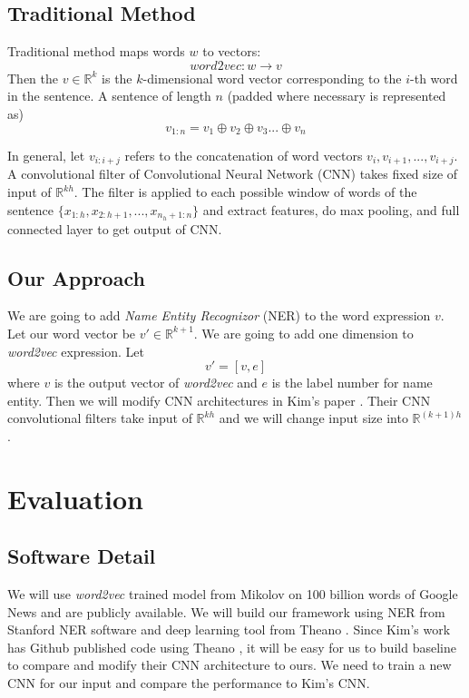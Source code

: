 \documentclass[10pt,twocolumn,letterpaper]{article}
\begin{document}
\subsection{Traditional Method}
Traditional method maps words $w$ to vectors:
$$word2vec:w \rightarrow v $$
Then the $v \in \mathbb{R}^k$ is the $k$-dimensional word vector corresponding to the $i$-th word in the sentence. A sentence of length $n$ (padded where necessary is represented as)
$$v_{1:n} = v_1 \oplus v_2 \oplus v_3 ... \oplus v_n$$

In general, let $v_{i:i+j}$ refers to the concatenation of word vectors $v_i, v_{i+1}, ..., v_{i+j}$. A convolutional filter of Convolutional Neural Network (CNN)  \cite{kim2014convolutional} takes fixed size of input of $\mathbb{R}^{kh}$. The filter is applied to each possible window of words of the sentence $\{x_{1:h}, x_{2:h+1}, ..., x_{n_h+1:n}\}$ and extract features, do max pooling, and full connected layer to get output of CNN.

\subsection{Our Approach}
We are going to add \textit{Name Entity Recognizor} (NER) to the word expression $v$. Let our word vector be $v' \in \mathbb{R}^{k+1}$. We are going to add one dimension to \textit{word2vec} expression. Let
$$v' = [v, e]$$
where $v$ is the output vector of \textit{word2vec} and $e$ is the label number for name entity. Then we will modify CNN architectures in Kim's paper \cite{kim2014convolutional}. Their CNN convolutional filters take input of $\mathbb{R}^{kh}$ and we will change input size into $\mathbb{R}^{(k+1)h}$. 

\section{Evaluation}
\subsection{Software Detail}
We will use \textit{word2vec} trained model from Mikolov \cite{mikolov2013efficient} on 100 billion words of Google News and are publicly available. We will build our framework using NER from Stanford NER software \cite{finkel2005incorporating} and deep learning tool from Theano \cite{Bastien-Theano-2012}. Since Kim's work\cite{kim2014convolutional} has Github published code using Theano \cite{Bastien-Theano-2012}, it will be easy for us to build baseline to compare and modify their CNN architecture to ours. We need to train a new CNN for our input and compare the performance to Kim's CNN.
\end{document}
